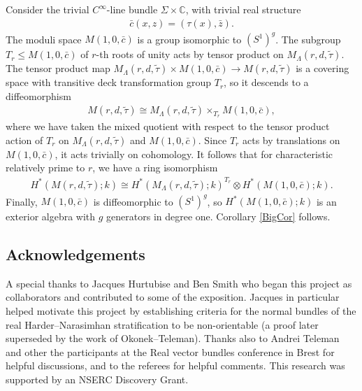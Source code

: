 \documentclass[pdftex]{sigma}
\numberwithin{equation}{section}
\begin{document}
Consider the trivial $C^{\infty}$-line bundle $\Sigma \times {\mathbb C}$, with trivial real structure \begin{gather*}\bar{c}(x,z) = (\tau(x),\bar{z}).\end{gather*}
The moduli space $M(1,0,\bar{c})$ is a group isomorphic to $(S^1)^g$. The subgroup $T_r \leq M(1,0,\bar{c})$ of $r$-th roots of unity acts by tensor product on $M_{\Lambda}(r,d,\tilde{\tau})$. The tensor product map $ M_{\Lambda}(r,d,\tilde{\tau}) \times M(1,0, \bar{c}) \rightarrow M(r,d,\tilde{\tau})$ is a covering space with transitive deck transformation group $T_r$, so it descends to a dif\/feomorphism
\begin{gather*} M(r,d,\tilde{\tau}) \cong M_{\Lambda}(r,d,\tilde{\tau}) \times_{T_r} M(1,0, \bar{c}),\end{gather*}
where we have taken the mixed quotient with respect to the tensor product action of $T_r$ on $M_{\Lambda}(r,d,\tilde{\tau})$ and $M(1,0, \bar{c})$. Since $T_r$ acts by translations on $M(1,0, \bar{c})$, it acts trivially on cohomology. It follows that for characteristic relatively prime to $r$, we have a ring isomorphism
	\begin{gather*} H^*(M(r,d,\tilde{\tau});k) \cong H^*(M_{\Lambda}(r,d,\tilde{\tau});k)^{T_r} \otimes H^*(M(1,0, \bar{c});k ). \end{gather*}
	Finally, $M(1,0, \bar{c})$ is dif\/feomorphic to $(S^1)^g$, so $H^*(M(1,0, \bar{c});k )$ is an exterior algebra with $g$ generators in degree one. Corollary \ref{BigCor} follows.


\subsection*{Acknowledgements}
A special thanks to Jacques Hurtubise and Ben Smith who began this project as collaborators and contributed to some of the exposition. Jacques in particular helped motivate this project by establishing criteria for the normal bundles of the real Harder--Narasimhan stratif\/ication to be non-orientable (a proof later superseded by the work of Okonek--Teleman). Thanks also to Andrei Teleman and other the participants at the Real vector bundles conference in Brest for helpful discussions, and to the referees for helpful comments. This research was supported by an NSERC Discovery Grant.
\end{document}
